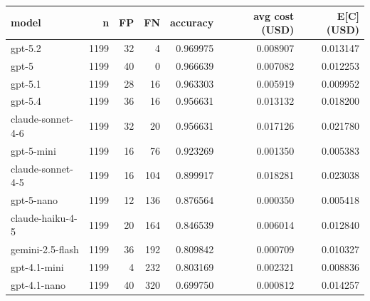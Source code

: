 
\begin{tabular}{lrrrrrr}
    \toprule
    model & n & FP & FN & accuracy & avg cost (USD) & E[C] (USD) \\
    \midrule
    gpt-5.2 & 1199 & 32 & 4 & 0.969975 & 0.008907 & 0.013147 \\
    gpt-5 & 1199 & 40 & 0 & 0.966639 & 0.007082 & 0.012253 \\
    gpt-5.1 & 1199 & 28 & 16 & 0.963303 & 0.005919 & 0.009952 \\
    gpt-5.4 & 1199 & 36 & 16 & 0.956631 & 0.013132 & 0.018200 \\
    claude-sonnet-4-6 & 1199 & 32 & 20 & 0.956631 & 0.017126 & 0.021780 \\
    gpt-5-mini & 1199 & 16 & 76 & 0.923269 & 0.001350 & 0.005383 \\
    claude-sonnet-4-5 & 1199 & 16 & 104 & 0.899917 & 0.018281 & 0.023038 \\
    gpt-5-nano & 1199 & 12 & 136 & 0.876564 & 0.000350 & 0.005418 \\
    claude-haiku-4-5 & 1199 & 20 & 164 & 0.846539 & 0.006014 & 0.012840 \\
    gemini-2.5-flash & 1199 & 36 & 192 & 0.809842 & 0.000709 & 0.010327 \\
    gpt-4.1-mini & 1199 & 4 & 232 & 0.803169 & 0.002321 & 0.008836 \\
    gpt-4.1-nano & 1199 & 40 & 320 & 0.699750 & 0.000812 & 0.014257 \\
    \bottomrule
    \end{tabular}
